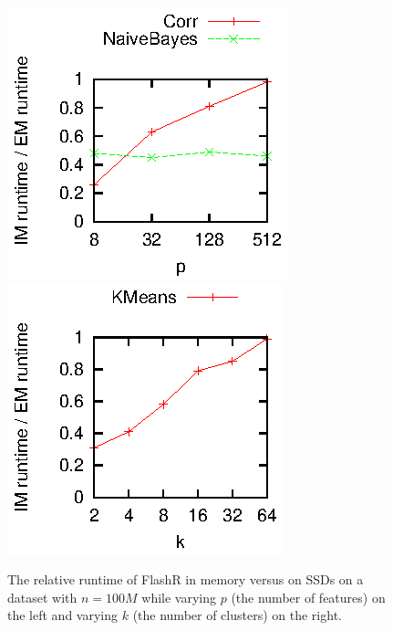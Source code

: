 \begin{figure}[t]
	\begin{center}
		\footnotesize
		\includegraphics{FlashMatrix_figs/IM-vs-EM-stat.eps}
		\includegraphics{FlashMatrix_figs/IM-vs-EM-clust.eps}
		\caption{The relative runtime of FlashR in memory versus on SSDs
		on a dataset with $n=100M$ while varying $p$ (the number of features)
		on the left and varying $k$ (the number of clusters) on the right.}
		\label{perf:stat}
	\end{center}
  \vspace{-15pt}
\end{figure}


